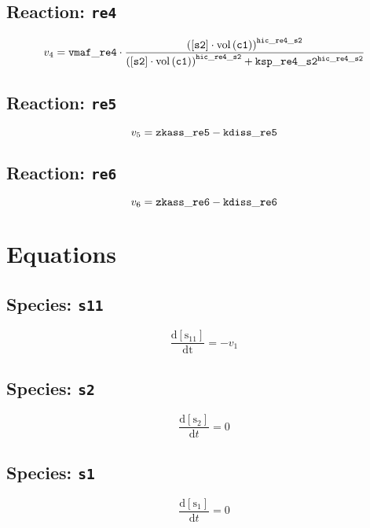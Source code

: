 \documentclass[11pt,a4paper]{scrartcl}
\begin{document}
\subsection{Reaction: \texttt{re4}}

\begin{equation}
v_{4}=\mathtt{vmaf\-\_re4}\cdot \frac{\left([\mathtt{s2}]\cdot \mathrm{vol}\left(\mathtt{c1}\right)\right)^{\mathtt{hic\-\_re4\-\_s2}}}{\left([\mathtt{s2}]\cdot \mathrm{vol}\left(\mathtt{c1}\right)\right)^{\mathtt{hic\-\_re4\-\_s2}}+\mathtt{ksp\-\_re4\-\_s2}^{\mathtt{hic\-\_re4\-\_s2}}}
\end{equation}
\subsection{Reaction: \texttt{re5}}

\begin{equation}
v_{5}=\mathtt{zkass\-\_re5}-\mathtt{kdiss\-\_re5}
\end{equation}
\subsection{Reaction: \texttt{re6}}

\begin{equation}
v_{6}=\mathtt{zkass\-\_re6}-\mathtt{kdiss\-\_re6}
\end{equation}

\section{Equations}\subsection{Species: \texttt{s11}}
\begin{equation}
\frac{\mathrm{d[s_{11}]}}{\mathrm {dt}}= -v_{1}
\end{equation}
\subsection{Species: \texttt{s2}}
\begin{equation}
\frac{\mathrm{d[s_2]}}{\mathrm dt}= 0
\end{equation}
\subsection{Species: \texttt{s1}}
\begin{equation}
\frac{\mathrm{d[s_1]}}{\mathrm dt}= 0
\end{equation}
\end{document}
